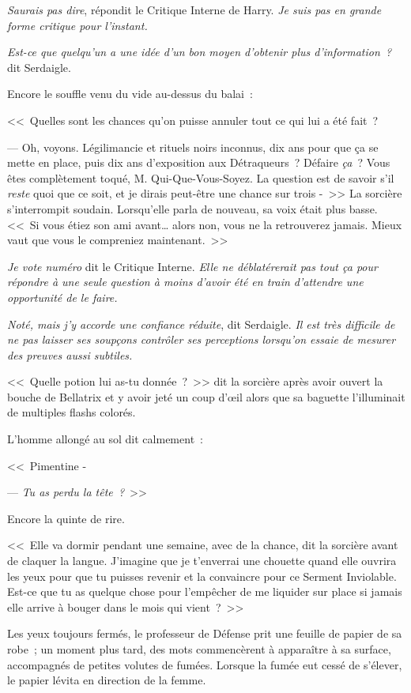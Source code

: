 \emph{Saurais pas dire}, répondit le Critique Interne de Harry. \emph{Je suis pas en grande forme critique pour l'instant.}

\emph{Est-ce que quelqu'un a une idée d'un bon moyen d'obtenir plus d'information~?} dit Serdaigle.

Encore le souffle venu du vide au-dessus du balai~:

<<~Quelles sont les chances qu'on puisse annuler tout ce qui lui a été fait~?

--- Oh, voyons. Légilimancie et rituels noirs inconnus, dix ans pour que ça se mette en place, puis dix ans d'exposition aux Détraqueurs~? Défaire \emph{ça}~? Vous êtes complètement toqué, M. Qui-Que-Vous-Soyez. La question est de savoir s'il \emph{reste} quoi que ce soit, et je dirais peut-être une chance sur trois -~>> La sorcière s'interrompit soudain. Lorsqu'elle parla de nouveau, sa voix était plus basse. <<~Si vous étiez son ami avant… alors non, vous ne la retrouverez jamais. Mieux vaut que vous le compreniez maintenant.~>>

\emph{Je vote numéro} dit le Critique Interne. \emph{Elle ne déblatérerait pas tout ça pour répondre à une seule question à moins d'avoir été en train d'attendre une opportunité de le faire.}

\emph{Noté, mais j'y accorde une confiance réduite}, dit Serdaigle. \emph{Il est très difficile de ne pas laisser ses soupçons contrôler ses perceptions lorsqu'on essaie de mesurer des preuves aussi subtiles.}

<<~Quelle potion lui as-tu donnée~?~>> dit la sorcière après avoir ouvert la bouche de Bellatrix et y avoir jeté un coup d'œil alors que sa baguette l'illuminait de multiples flashs colorés.

L'homme allongé au sol dit calmement~:

<<~Pimentine -

--- \emph{Tu as perdu la tête~?}~>>

Encore la quinte de rire.

<<~Elle va dormir pendant une semaine, avec de la chance, dit la sorcière avant de claquer la langue. J'imagine que je t'enverrai une chouette quand elle ouvrira les yeux pour que tu puisses revenir et la convaincre pour ce Serment Inviolable. Est-ce que tu as quelque chose pour l'empêcher de me liquider sur place si jamais elle arrive à bouger dans le mois qui vient~?~>>

Les yeux toujours fermés, le professeur de Défense prit une feuille de papier de sa robe~; un moment plus tard, des mots commencèrent à apparaître à sa surface, accompagnés de petites volutes de fumées. Lorsque la fumée eut cessé de s'élever, le papier lévita en direction de la femme.

